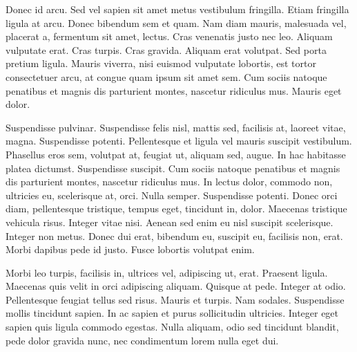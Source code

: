 Donec id arcu. Sed vel sapien sit amet metus vestibulum
fringilla. Etiam fringilla ligula at arcu. Donec bibendum sem et
quam. Nam diam mauris, malesuada vel, placerat a, fermentum sit amet,
lectus. Cras venenatis justo nec leo. Aliquam vulputate erat. Cras
turpis. Cras gravida. Aliquam erat volutpat. Sed porta pretium
ligula. Mauris viverra, nisi euismod vulputate lobortis, est tortor
consectetuer arcu, at congue quam ipsum sit amet sem. Cum sociis
natoque penatibus et magnis dis parturient montes, nascetur ridiculus
mus. Mauris eget dolor.

Suspendisse pulvinar. Suspendisse felis nisl, mattis sed, facilisis
at, laoreet vitae, magna. Suspendisse potenti. Pellentesque et ligula
vel mauris suscipit vestibulum. Phasellus eros sem, volutpat at,
feugiat ut, aliquam sed, augue. In hac habitasse platea
dictumst. Suspendisse suscipit. Cum sociis natoque penatibus et magnis
dis parturient montes, nascetur ridiculus mus. In lectus dolor,
commodo non, ultricies eu, scelerisque at, orci. Nulla
semper. Suspendisse potenti. Donec orci diam, pellentesque tristique,
tempus eget, tincidunt in, dolor. Maecenas tristique vehicula
risus. Integer vitae nisi. Aenean sed enim eu nisl suscipit
scelerisque. Integer non metus. Donec dui erat, bibendum eu, suscipit
eu, facilisis non, erat. Morbi dapibus pede id justo. Fusce lobortis
volutpat enim.

Morbi leo turpis, facilisis in, ultrices vel, adipiscing ut,
erat. Praesent ligula. Maecenas quis velit in orci adipiscing
aliquam. Quisque at pede. Integer at odio. Pellentesque feugiat tellus
sed risus. Mauris et turpis. Nam sodales. Suspendisse mollis tincidunt
sapien. In ac sapien et purus sollicitudin ultricies. Integer eget
sapien quis ligula commodo egestas. Nulla aliquam, odio sed tincidunt
blandit, pede dolor gravida nunc, nec condimentum lorem nulla eget
dui.  


